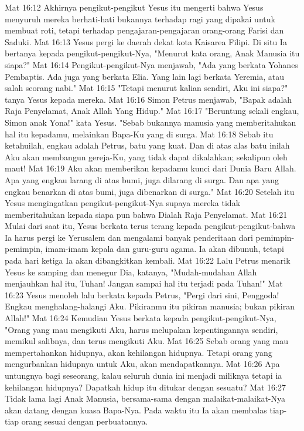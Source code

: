 Mat 16:12  Akhirnya pengikut-pengikut Yesus itu mengerti bahwa Yesus menyuruh mereka berhati-hati bukannya terhadap ragi yang dipakai untuk membuat roti, tetapi terhadap pengajaran-pengajaran orang-orang Farisi dan Saduki.
Mat 16:13  Yesus pergi ke daerah dekat kota Kaisarea Filipi. Di situ Ia bertanya kepada pengikut-pengikut-Nya, "Menurut kata orang, Anak Manusia itu siapa?"
Mat 16:14  Pengikut-pengikut-Nya menjawab, "Ada yang berkata Yohanes Pembaptis. Ada juga yang berkata Elia. Yang lain lagi berkata Yeremia, atau salah seorang nabi."
Mat 16:15  "Tetapi menurut kalian sendiri, Aku ini siapa?" tanya Yesus kepada mereka.
Mat 16:16  Simon Petrus menjawab, "Bapak adalah Raja Penyelamat, Anak Allah Yang Hidup."
Mat 16:17  "Beruntung sekali engkau, Simon anak Yona!" kata Yesus. "Sebab bukannya manusia yang memberitahukan hal itu kepadamu, melainkan Bapa-Ku yang di surga.
Mat 16:18  Sebab itu ketahuilah, engkau adalah Petrus, batu yang kuat. Dan di atas alas batu inilah Aku akan membangun gereja-Ku, yang tidak dapat dikalahkan; sekalipun oleh maut!
Mat 16:19  Aku akan memberikan kepadamu kunci dari Dunia Baru Allah. Apa yang engkau larang di atas bumi, juga dilarang di surga. Dan apa yang engkau benarkan di atas bumi, juga dibenarkan di surga."
Mat 16:20  Setelah itu Yesus mengingatkan pengikut-pengikut-Nya supaya mereka tidak memberitahukan kepada siapa pun bahwa Dialah Raja Penyelamat.
Mat 16:21  Mulai dari saat itu, Yesus berkata terus terang kepada pengikut-pengikut-bahwa Ia harus pergi ke Yerusalem dan mengalami banyak penderitaan dari pemimpin-pemimpin, imam-imam kepala dan guru-guru agama. Ia akan dibunuh, tetapi pada hari ketiga Ia akan dibangkitkan kembali.
Mat 16:22  Lalu Petrus menarik Yesus ke samping dan menegur Dia, katanya, "Mudah-mudahan Allah menjauhkan hal itu, Tuhan! Jangan sampai hal itu terjadi pada Tuhan!"
Mat 16:23  Yesus menoleh lalu berkata kepada Petrus, "Pergi dari sini, Penggoda! Engkau menghalang-halangi Aku. Pikiranmu itu pikiran manusia; bukan pikiran Allah!"
Mat 16:24  Kemudian Yesus berkata kepada pengikut-pengikut-Nya, "Orang yang mau mengikuti Aku, harus melupakan kepentingannya sendiri, memikul salibnya, dan terus mengikuti Aku.
Mat 16:25  Sebab orang yang mau mempertahankan hidupnya, akan kehilangan hidupnya. Tetapi orang yang mengurbankan hidupnya untuk Aku, akan mendapatkannya.
Mat 16:26  Apa untungnya bagi seseorang, kalau seluruh dunia ini menjadi miliknya tetapi ia kehilangan hidupnya? Dapatkah hidup itu ditukar dengan sesuatu?
Mat 16:27  Tidak lama lagi Anak Manusia, bersama-sama dengan malaikat-malaikat-Nya akan datang dengan kuasa Bapa-Nya. Pada waktu itu Ia akan membalas tiap-tiap orang sesuai dengan perbuatannya.
